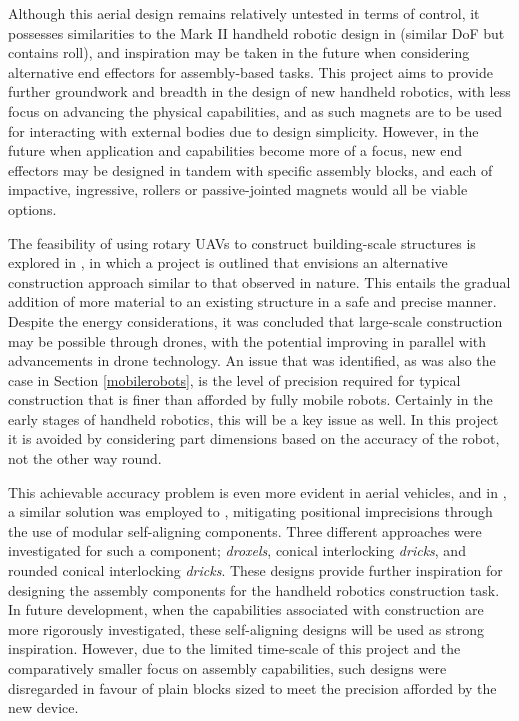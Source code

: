 \documentclass[11pt]{article}
\begin{document}
Although this aerial design remains relatively untested in terms of control, it possesses similarities to the Mark II handheld robotic design in \cite{GreggSmithKinematics} (similar DoF but contains roll), and inspiration may be taken in the future when considering alternative end effectors for assembly-based tasks. This project aims to provide further groundwork and breadth in the design of new handheld robotics, with less focus on advancing the physical capabilities, and as such magnets are to be used for interacting with external bodies due to design simplicity. However, in the future when application and capabilities become more of a focus, new end effectors may be designed in tandem with specific assembly blocks, and each of impactive, ingressive, rollers or passive-jointed magnets would all be viable options.


The feasibility of using rotary UAVs to construct building-scale structures is explored in \cite{latteur2015}, in which a project is outlined that envisions an alternative construction approach similar to that observed in nature. This entails the gradual addition of more material to an existing structure in a safe and precise manner. Despite the energy considerations, it was concluded that large-scale construction may be possible through drones, with the potential improving in parallel with advancements in drone technology. An issue that was identified, as was also the case in Section \ref{mobilerobots}, is the level of precision required for typical construction that is finer than afforded by fully mobile robots. Certainly in the early stages of handheld robotics, this will be a key issue as well. In this project it is avoided by considering part dimensions based on the accuracy of the robot, not the other way round. 

This achievable accuracy problem is even more evident in aerial vehicles, and in \cite{latteur2015}, a similar solution was employed to \cite{Petersen2011}, mitigating positional imprecisions through the use of modular self-aligning components. Three different approaches were investigated for such a component; \textit{droxels}, conical interlocking \textit{dricks}, and rounded conical interlocking \textit{dricks}. These designs provide further inspiration for designing the assembly components for the handheld robotics construction task. In future development, when the capabilities associated with construction are more rigorously investigated, these self-aligning designs will be used as strong inspiration. However, due to the limited time-scale of this project and the comparatively smaller focus on assembly capabilities, such designs were disregarded in favour of plain blocks sized to meet the precision afforded by the new device.
\end{document}
